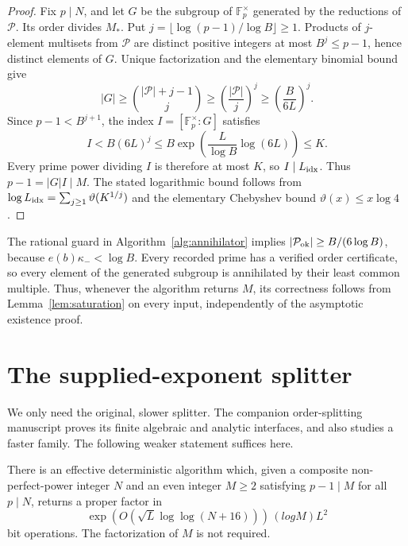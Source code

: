 \begin{proof}
Fix \(p\mid N\), and let \(G\) be the subgroup of
\(\mathbb F_p^\times\) generated by the reductions of
\(\mathcal P\).  Its order divides \(M_*\).  Put
\(j=\lfloor\log(p-1)/\log B\rfloor\ge1\).
Products of \(j\)-element multisets from \(\mathcal P\) are
distinct positive integers at most \(B^j\le p-1\), hence distinct
elements of \(G\).  Unique factorization and the elementary
binomial bound give
\[
 |G|\ge {|\mathcal P|+j-1\choose j}
       \ge\left(\frac{|\mathcal P|}{j}\right)^j
       \ge\left(\frac B{6L}\right)^j.
\]
Since \(p-1<B^{j+1}\), the index \(I=[\mathbb F_p^\times:G]\)
satisfies
\[
 I<B(6L)^j\le B\exp\left(\frac L{\log B}\log(6L)\right)\le K.
\]
Every prime power dividing \(I\) is therefore at most \(K\), so
\(I\mid L_{\rm idx}\).  Thus \(p-1=|G|I\mid M\).
The stated logarithmic bound follows from
\(\log L_{\rm idx}=\sum_{j\ge1}\vartheta(K^{1/j})\) and the
elementary Chebyshev bound \(\vartheta(x)\le x\log4\).
\end{proof}

The rational guard in Algorithm~\ref{alg:annihilator} implies
\(|\mathcal P_{\rm ok}|\ge B/(6\log B)\), because
\(e(b)\kappa_-<\log B\).  Every recorded prime has a verified
order certificate, so every element of the generated subgroup is
annihilated by their least common multiple.  Thus, whenever the
algorithm returns \(M\), its correctness follows from
Lemma~\ref{lem:saturation} on every input, independently of the
asymptotic existence proof.

\section{The supplied-exponent splitter}
\label{sec:splitter}

We only need the original, slower splitter.  The companion
order-splitting manuscript proves its finite algebraic and analytic
interfaces, and also studies a faster family.  The following weaker
statement suffices here.

\begin{theorem}\label{thm:splitter}
There is an effective deterministic algorithm which, given a
composite non-perfect-power integer \(N\) and an even integer
\(M\ge2\) satisfying \(p-1\mid M\) for all \(p\mid N\),
returns a proper factor in
\[
 \exp(O(\sqrt L\log\log(N+16)))\,(log M)L^2
\]
bit operations.  The factorization of \(M\) is not required.
\end{theorem}

